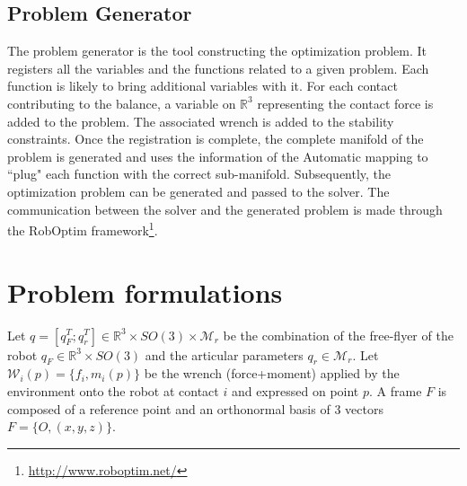 \subsection{Problem Generator}

The problem generator is the tool constructing the optimization problem.
It registers all the variables and the functions related to a given problem.
Each function is likely to bring additional variables with it.
For each contact contributing to the balance, a variable on $\mathbb{R}^3$ representing the contact force is added to the problem.
The associated wrench is added to the stability constraints.
Once the registration is complete, the complete manifold of the problem is generated and uses the information of the Automatic mapping to ``plug" each function with the correct sub-manifold.
Subsequently, the optimization problem can be generated and passed to the solver.
The communication between the solver and the generated problem is made through the RobOptim framework\footnote{\url{http://www.roboptim.net/}}.%

\section{Problem formulations}
\label{sec:3}
Let $q=[q_F^T; q_r^T]\in\mathbb{R}^3\times SO(3)\times \mathcal{M}_r$ be the combination of the free-flyer of the robot $q_F\in \mathbb{R}^3 \times SO(3)$ and the articular parameters $q_r\in\mathcal{M}_r$.
Let $\mathcal{W}_i(p)=\{f_i,m_i(p)\}$ be the wrench (force+moment) applied by the environment onto the robot at contact $i$ and expressed on point $p$.
A frame $F$ is composed of a reference point and an orthonormal basis of 3 vectors $F = \{O, (x, y, z)\}$.


